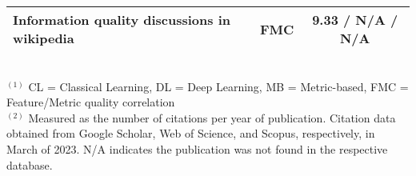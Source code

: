 \begin{table}[htbp]
\begin{tabular}{m{} c c}
        Information quality discussions in wikipedia~\cite{Stvilia2005_lr12} & FMC & 9.33 / N/A / N/A \\
        \bottomrule
    \end{tabular}
    \vspace{0.1cm}
    \footnotesize
    \RaggedRight
    \\$^{(1)}$ CL = Classical Learning, DL = Deep Learning, MB = Metric-based, FMC = Feature/Metric quality correlation
    \\$^{(2)}$ Measured as the number of citations per year of publication. Citation data obtained from Google Scholar, Web of Science, and Scopus, respectively, in March of 2023. N/A indicates the publication was not found in the respective database.
\end{table}